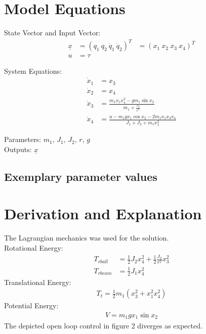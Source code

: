 \documentclass[10pt,a4paper]{article}
\begin{document}
	
	\section{Model Equations} %
	
	State Vector and Input Vector:
	\begin{align*}
		\underline{x} &= (q_1 \ q_2 \ \dot{q}_1 \ \dot{q}_2)^T &= (x_1 \ x_2 \ x_3 \ x_4)^T\\
		u &= \tau  
	\end{align*}
	
	\noindent System Equations:			
	\begin{subequations}
	\begin{align}
		\dot{x}_1 &= x_3 \\
		\dot{x}_2 &= x_4 \\
		\dot{x}_3 &= \frac{m_1x_1x_4^2 - gm_1\sin x_2}{m_1 + \frac{J_2}{r^2}}\\
		\dot{x}_4 &= \frac{u - m_1gx_1 \cos x_2 - 2m_1x_1x_3x_4}{J_1 + J_2 + m_1x_1^2}		
	\end{align}
	\end{subequations}

	\noindent
	Parameters:  $m_1, \, J_1 , \, J_2, \, r, \, g$ %
	\\
	Outputs: $\underline{x}$ 
	
	
	
	\subsection{Exemplary parameter values}
	

	
	\section{Derivation and Explanation} %
	The Lagrangian mechanics was used for the solution. \\
	Rotational Energy: 
	\begin{align}
		T_{rball} &= \frac{1}{2}J_2x_4^2 + \frac{1}{2} \frac{J_2}{r^2} x_3^2 \\
		T_{rbeam} &= \frac{1}{2}J_1x_4^2
	\end{align}
	Translational Energy: 
	\begin{align}
		T_{t} = \frac{1}{2}m_1(x_3^2 + x_1^2x_4^2)
	\end{align}
	Potential Energy: 
	\begin{align}
		V = m_1gx_1 \sin x_2
	\end{align}
	The depicted open loop control in figure 2 diverges as expected.
	
\end{document}
